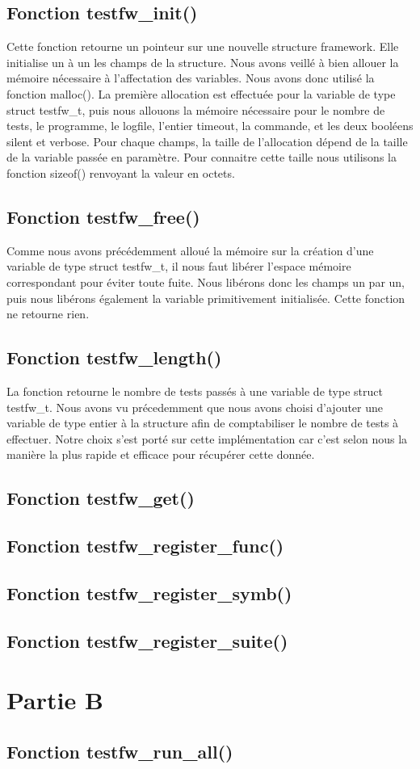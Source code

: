 \documentclass{article}
\begin{document}
\subsection{Fonction testfw\_init()}
Cette fonction retourne un pointeur sur une nouvelle structure framework. Elle initialise un à un les champs de la structure. Nous avons veillé à bien allouer la mémoire nécessaire à l'affectation des variables. Nous avons donc utilisé la fonction malloc(). La première allocation est effectuée pour la variable de type struct testfw\_t, puis nous allouons la mémoire nécessaire pour le nombre de tests, le programme, le logfile, l'entier timeout, la commande, et les deux booléens silent et verbose. Pour chaque champs, la taille de l'allocation dépend de la taille de la variable passée en paramètre. Pour connaitre cette taille nous utilisons la fonction sizeof() renvoyant la valeur en octets. 


\subsection{Fonction testfw\_free()}

Comme nous avons précédemment alloué la mémoire sur la création d'une variable de type struct testfw\_t, il nous faut libérer l'espace mémoire correspondant pour éviter toute fuite. Nous libérons donc les champs un par un, puis nous libérons également la variable primitivement initialisée. Cette fonction ne retourne rien.


\subsection{Fonction testfw\_length()}
La fonction retourne le nombre de tests passés à une variable de type struct testfw\_t. Nous avons vu précedemment que nous avons choisi d'ajouter une variable de type entier à la structure afin de comptabiliser le nombre de tests à effectuer. Notre choix s'est porté sur cette implémentation car c'est selon nous la manière la plus rapide et efficace pour récupérer cette donnée.

\subsection{Fonction testfw\_get()}
\subsection{Fonction testfw\_register\_func()}
\subsection{Fonction testfw\_register\_symb()}
\subsection{Fonction testfw\_register\_suite()}
 
\section{Partie B}
\subsection{Fonction testfw\_run\_all()}
  
\end{document}
